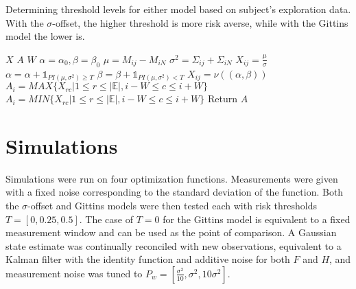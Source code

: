 \begin{algorithm}[t]
\caption{Determining threshold levels for either model based on subject's exploration data. With the $\sigma$-offset, the higher threshold is more risk averse, while with the Gittins model the lower is.}
\label{alg:adapthresh}
\begin{algorithmic}
\State {} $X$
\State {} $A$
\State {} $W$
  \State $\alpha = \alpha_0, \beta = \beta_0$
    \State $\mu = M_{ij} - M_{iN}$
    \State $\sigma^2 = \Sigma_{ij} + \Sigma_{iN}$
      \State $X_{ij} = \frac{\mu}{\sigma}$
    \EndIf
      \State $\alpha = \alpha + \mathbb{1}_{PI(\mu, \sigma^2) \geq T}$
      \State $\beta = \beta + \mathbb{1}_{PI(\mu, \sigma^2) < T}$
      \State $X_{ij} = \nu((\alpha, \beta))$
    \EndIf
  \End
\End
{}
    \State $A_{i} = MAX\{X_{rc}\vert 1 \leq r \leq \vert\mathbb{E}\vert, i-W \leq c \leq i+W\}$
  \EndIf
    \State $A_{i} = MIN\{X_{rc}\vert 1 \leq r \leq \vert\mathbb{E}\vert, i-W \leq c \leq i+W\}$
  \EndIf
\End
\State Return $A$
\end{algorithmic}
\end{algorithm}

\section{Simulations}
Simulations were run on four optimization functions. Measurements were given with a fixed noise corresponding to the standard deviation of the function. Both the $\sigma$-offset and Gittins models were then tested each with risk thresholds $T=[0, 0.25, 0.5]$. The case of $T=0$ for the Gittins model is equivalent to a fixed measurement window and can be used as the point of comparison. A Gaussian state estimate was continually reconciled with new observations, equivalent to a Kalman filter with the identity function and additive noise for both $F$ and $H$, and measurement noise was tuned to $P_w=[\frac{\sigma^2}{10}, \sigma^2, 10\sigma^2]$.

